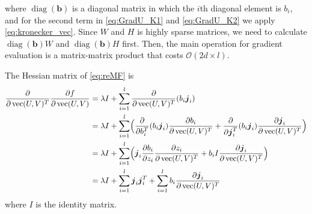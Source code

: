 \documentclass[11pt,twoside]{article}
\newcommand{\bsym}[1]{\ensuremath{\boldsymbol{#1}}}
\newcommand{\bj}{\ensuremath{\bsym{j}}}
\newcommand{\bbO}[1]{\ensuremath{\mathcal{O}\left(#1\right)}}
\DeclareMathOperator*{\diag}{diag}
\DeclareMathOperator*{\vectorize}{vec}
\begin{document}
where $\diag(\bsym{b})$ is a diagonal matrix in which the $i$th diagonal element is $b_i$, and for the second term in \eqref{eq:GradU_K1} and \eqref{eq:GradU_K2} we apply \eqref{eq:kronecker_vec}. 
Since $W$ and $H$ is highly sparse matrices, we need to calculate $\diag(\bsym{b})W$ and $\diag(\bsym{b})H$ first.
Then, the main operation for gradient evaluation is a matrix-matrix product that costs $\bbO{2d\times l}$.
\par

The Hessian matrix of \eqref{eq:reMF} is 
\begin{align}
\pdv{\vectorize(U,V)^T} \frac{\partial f}{\partial \vectorize(U,V)}
&=\lambda I + \sum_{i=1}^{l}\pdv{\vectorize(U,V)^T} (b_i \bj_i)\nonumber\\
&=\lambda I + \sum_{i=1}^{l} \Bigl( \pdv{b_i^T} (b_i \bj_i) \frac{\partial b_i}{\partial \vectorize(U,V)^T} + \pdv{\bj_i^T} (b_i \bj_i) \frac{\partial \bj_i}{\partial \vectorize(U,V)^T} \Bigr)\nonumber\\
&=\lambda I + \sum_{i=1}^{l} \Bigl( \bj_i \frac{\partial b_i}{\partial z_i} \frac{\partial z_i}{\partial \vectorize(U,V)^T} + b_i I \frac{\partial \bj_i}{\partial \vectorize(U,V)^T} \Bigr)\nonumber\\
&=\lambda I + \sum_{i=1}^{l} \bj_i \bj_i^T + \sum_{i=1}^{l} b_i \frac{\partial \bj_i}{\partial \vectorize(U,V)^T} 
\label{eq:H}
\end{align}
where $I$ is the identity matrix.
\end{document}
